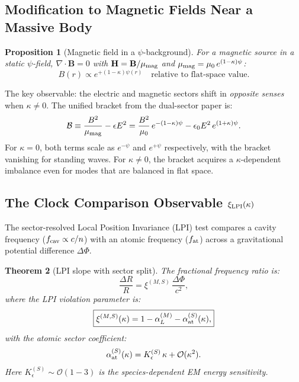 \documentclass[11pt]{article}
\newtheorem{theorem}{Theorem}[section]
\newtheorem{proposition}[theorem]{Proposition}
\newcommand{\vB}{\mathbf{B}}
\newcommand{\vH}{\mathbf{H}}
\begin{document}
\subsection{Modification to Magnetic Fields Near a Massive Body}

\begin{proposition}[Magnetic field in a $\psi$-background]
For a magnetic source in a static $\psi$-field, $\nabla\cdot\vB = 0$
with $\vH = \vB/\mu_{\rm mag}$ and $\mu_{\rm mag} = \mu_0\, e^{(1-\kappa)\psi}$:
\begin{equation}
\boxed{
B(r) \propto e^{+(1-\kappa)\psi(r)} \quad \text{relative to flat-space value}.
}
\label{eq:B-modified}
\end{equation}
\end{proposition}

The key observable: the electric and magnetic sectors shift in
\emph{opposite senses} when $\kappa \neq 0$.  The unified bracket
from the dual-sector paper is:
\begin{equation}
\mathcal{B} \equiv \frac{B^2}{\mu_{\rm mag}} - \epsilon E^2
= \frac{B^2}{\mu_0}\, e^{-(1-\kappa)\psi} - \epsilon_0 E^2\, e^{(1+\kappa)\psi}.
\end{equation}
For $\kappa = 0$, both terms scale as $e^{-\psi}$ and $e^{+\psi}$ respectively,
with the bracket vanishing for standing waves.
For $\kappa \neq 0$, the bracket acquires a $\kappa$-dependent imbalance
even for modes that are balanced in flat space.

\subsection{The Clock Comparison Observable $\xi_{\rm LPI}(\kappa)$}

The sector-resolved Local Position Invariance (LPI) test compares
a cavity frequency ($f_{\rm cav} \propto c/n$) with an atomic frequency
($f_{\rm at}$) across a gravitational potential difference $\Delta\Phi$.

\begin{theorem}[LPI slope with sector split]
\label{thm:LPI}
The fractional frequency ratio is:
\begin{equation}
\frac{\Delta R}{R} = \xi^{(M,S)}\,\frac{\Delta\Phi}{c^2},
\end{equation}
where the LPI violation parameter is:
\begin{equation}
\boxed{
\xi^{(M,S)}(\kappa) = 1 - \alpha_L^{(M)} - \alpha_{\rm at}^{(S)}(\kappa),
}
\label{eq:xi-LPI}
\end{equation}
with the atomic sector coefficient:
\begin{equation}
\alpha_{\rm at}^{(S)}(\kappa) = K_\epsilon^{(S)}\,\kappa + \mathcal{O}(\kappa^2).
\label{eq:alpha-at}
\end{equation}
Here $K_\epsilon^{(S)} \sim \mathcal{O}(1{-}3)$ is the species-dependent
EM energy sensitivity.
\end{theorem}
\end{document}
